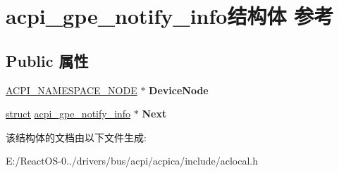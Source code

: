 \hypertarget{structacpi__gpe__notify__info}{}\section{acpi\+\_\+gpe\+\_\+notify\+\_\+info结构体 参考}
\label{structacpi__gpe__notify__info}
\subsection*{Public 属性}
\begin{DoxyCompactItemize}
\item 
\mbox{\label{structacpi__gpe__notify__info_aebfba464f57cc0f3465e4cd8a5ec8b3e}} 
\hyperlink{structacpi__namespace__node}{A\+C\+P\+I\+\_\+\+N\+A\+M\+E\+S\+P\+A\+C\+E\+\_\+\+N\+O\+DE} $\ast$ {\bfseries Device\+Node}
\item 
\mbox{\label{structacpi__gpe__notify__info_a0e4f05e3a4ddcd94d9a36da5a886aacd}} 
\hyperlink{interfacestruct}{struct} \hyperlink{structacpi__gpe__notify__info}{acpi\+\_\+gpe\+\_\+notify\+\_\+info} $\ast$ {\bfseries Next}
\end{DoxyCompactItemize}


该结构体的文档由以下文件生成\+:\begin{DoxyCompactItemize}
\item 
E\+:/\+React\+O\+S-\/0../drivers/bus/acpi/acpica/include/aclocal.\+h\end{DoxyCompactItemize}
